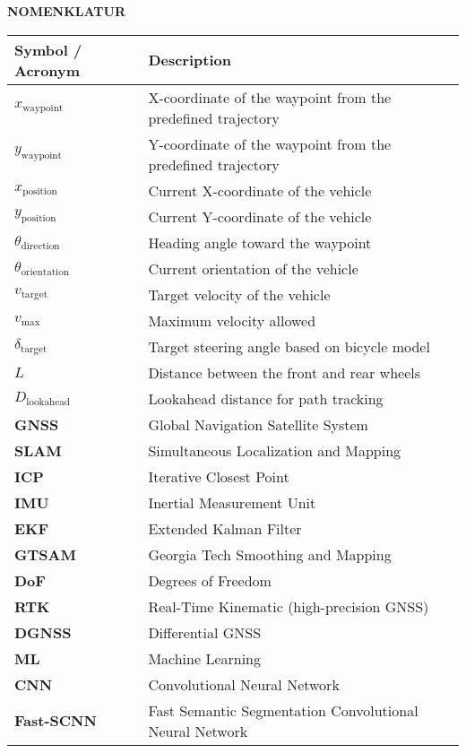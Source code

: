 \begin{center}
\Large\textbf{NOMENKLATUR}
\end{center}
\vspace{1ex}

\begin{longtable}{p{5cm} p{10cm}}
	\textbf{Symbol / Acronym} & \textbf{Description} \\
	\hline
	$x_{\text{waypoint}}$ & X-coordinate of the waypoint from the predefined trajectory \\
	$y_{\text{waypoint}}$ & Y-coordinate of the waypoint from the predefined trajectory \\
	$x_{\text{position}}$ & Current X-coordinate of the vehicle \\
	$y_{\text{position}}$ & Current Y-coordinate of the vehicle \\
	$\theta_{\text{direction}}$ & Heading angle toward the waypoint \\
	$\theta_{\text{orientation}}$ & Current orientation of the vehicle \\
	$v_{\text{target}}$ & Target velocity of the vehicle \\
	$v_{\text{max}}$ & Maximum velocity allowed \\
	$\delta_{\text{target}}$ & Target steering angle based on bicycle model \\
	$L$ & Distance between the front and rear wheels \\
	$D_{\text{lookahead}}$ & Lookahead distance for path tracking \\
	\hline
	\textbf{GNSS} & Global Navigation Satellite System \\
	\textbf{SLAM} & Simultaneous Localization and Mapping \\
	\textbf{ICP} & Iterative Closest Point \\
	\textbf{IMU} & Inertial Measurement Unit \\
	\textbf{EKF} & Extended Kalman Filter \\
	\textbf{GTSAM} & Georgia Tech Smoothing and Mapping \\
	\textbf{DoF} & Degrees of Freedom \\
	\textbf{RTK} & Real-Time Kinematic (high-precision GNSS) \\
	\textbf{DGNSS} & Differential GNSS \\
	\hline
	\textbf{ML} & Machine Learning \\
	\textbf{CNN} & Convolutional Neural Network \\
	\textbf{Fast-SCNN} & Fast Semantic Segmentation Convolutional Neural Network \\

\end{longtable}
